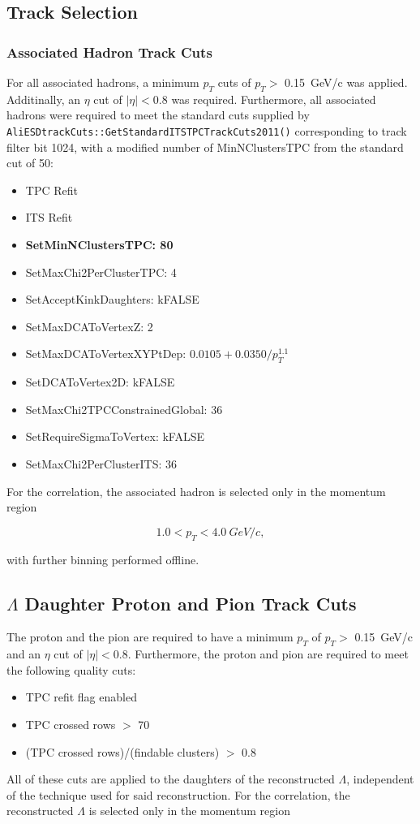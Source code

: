 \documentclass[ALICE,manyauthors]{ALICE_analysis_notes}
\begin{document}
\subsection{Track Selection}

\subsubsection{Associated Hadron Track Cuts}
\label{assoccuts}
For all associated hadrons, a minimum $p_{T}$ cuts of $p_{T} >$ \SI{0.15}{GeV/c} was applied.  Additinally, an $\eta$ cut of $|{\eta}| < 0.8$ was required. Furthermore, all associated hadrons were required to meet the standard cuts supplied by \texttt{AliESDtrackCuts::GetStandardITSTPCTrackCuts2011()} corresponding to track filter bit 1024, with a modified number of MinNClustersTPC from the standard cut of 50:

\begin{itemize}
    \item TPC Refit
    \item ITS Refit
	\item \textbf{SetMinNClustersTPC: 80}
	\item SetMaxChi2PerClusterTPC: 4
	\item SetAcceptKinkDaughters: kFALSE
	\item SetMaxDCAToVertexZ: 2
	\item SetMaxDCAToVertexXYPtDep: $0.0105+0.0350/p_{T}^{1.1}$
	\item SetDCAToVertex2D: kFALSE
	\item SetMaxChi2TPCConstrainedGlobal: 36
	\item SetRequireSigmaToVertex: kFALSE
	\item SetMaxChi2PerClusterITS: 36
\end{itemize}

For the correlation, the associated hadron is selected only in the momentum region

$${1.0 < p_{T} < \SI{4.0}{GeV/c}},$$ 

with further binning performed offline.

\subsection{$\Lambda$ Daughter Proton and Pion Track Cuts}
\label{daughtercuts}
The proton and the pion are required to have a minimum $p_{T}$ of $p_{T} >$ \SI{0.15}{GeV/c} and an $\eta$ cut of $|{\eta}| < 0.8$. Furthermore, the proton and pion are required to meet the following quality cuts:
\begin{itemize}
	\item TPC refit flag enabled
	\item TPC crossed rows $>$ 70
	\item (TPC crossed rows)/(findable clusters) $>$ 0.8
\end{itemize}
All of these cuts are applied to the daughters of the reconstructed $\Lambda$, independent of the technique used for said reconstruction. For the correlation, the reconstructed $\Lambda$ is selected only in the momentum region
\end{document}
